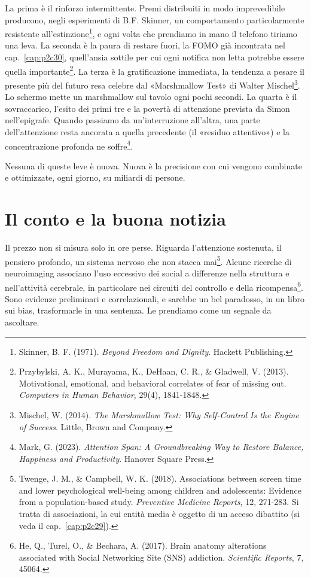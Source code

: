 
La prima è il rinforzo intermittente. Premi distribuiti in modo imprevedibile producono, negli esperimenti di B.F. Skinner, un comportamento particolarmente resistente all'estinzione\footnote{Skinner, B. F. (1971). \textit{Beyond Freedom and Dignity}. Hackett Publishing.}, e ogni volta che prendiamo in mano il telefono tiriamo una leva. La seconda è la paura di restare fuori, la FOMO già incontrata nel cap.~\ref{cap:p2c30}, quell'ansia sottile per cui ogni notifica non letta potrebbe essere quella importante\footnote{Przybylski, A. K., Murayama, K., DeHaan, C. R., \& Gladwell, V. (2013). Motivational, emotional, and behavioral correlates of fear of missing out. \textit{Computers in Human Behavior}, 29(4), 1841-1848.}. La terza è la gratificazione immediata, la tendenza a pesare il presente più del futuro resa celebre dal «Marshmallow Test» di Walter Mischel\footnote{Mischel, W. (2014). \textit{The Marshmallow Test: Why Self-Control Is the Engine of Success}. Little, Brown and Company.}. Lo schermo mette un marshmallow sul tavolo ogni pochi secondi. La quarta è il sovraccarico, l'esito dei primi tre e la povertà di attenzione prevista da Simon nell'epigrafe. Quando passiamo da un'interruzione all'altra, una parte dell'attenzione resta ancorata a quella precedente (il «residuo attentivo») e la concentrazione profonda ne soffre\footnote{Mark, G. (2023). \textit{Attention Span: A Groundbreaking Way to Restore Balance, Happiness and Productivity}. Hanover Square Press.}.

Nessuna di queste leve è nuova. Nuova è la precisione con cui vengono combinate e ottimizzate, ogni giorno, su miliardi di persone.

\section{Il conto e la buona notizia}

Il prezzo non si misura solo in ore perse. Riguarda l'attenzione sostenuta, il pensiero profondo, un sistema nervoso che non stacca mai\footnote{Twenge, J. M., \& Campbell, W. K. (2018). Associations between screen time and lower psychological well-being among children and adolescents: Evidence from a population-based study. \textit{Preventive Medicine Reports}, 12, 271-283. Si tratta di associazioni, la cui entità media è oggetto di un acceso dibattito (si veda il cap.~\ref{cap:p2c29}).}. Alcune ricerche di neuroimaging associano l'uso eccessivo dei social a differenze nella struttura e nell'attività cerebrale, in particolare nei circuiti del controllo e della ricompensa\footnote{He, Q., Turel, O., \& Bechara, A. (2017). Brain anatomy alterations associated with Social Networking Site (SNS) addiction. \textit{Scientific Reports}, 7, 45064.}. Sono evidenze preliminari e correlazionali, e sarebbe un bel paradosso, in un libro sui bias, trasformarle in una sentenza. Le prendiamo come un segnale da ascoltare.

